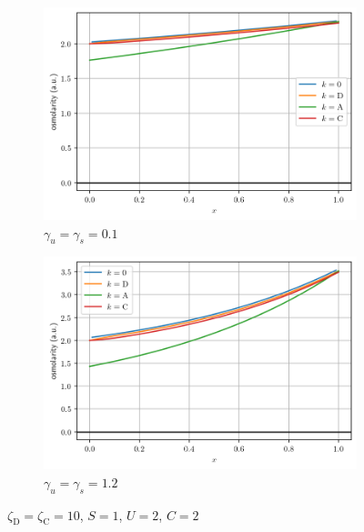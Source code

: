 \documentclass{article}
\numberwithin{equation}{section} %
\begin{document}
\begin{figure}
    \centering
    \begin{subfigure}{0.8\textwidth}
        \centering
        \includegraphics[width=\linewidth]{../results/7-20-2023/osm_low_solute_perm.png}
        \caption{$\gamma_u = \gamma_s = 0.1$}
        \label{fig:low_sol_perm}
        \vspace*{4mm}
    \end{subfigure}

    \begin{subfigure}{0.8\textwidth}
        \centering
        \includegraphics[width=\linewidth]{../results/7-20-2023/osm_high_solute_perm.png}
        \caption{$\gamma_u = \gamma_s = 1.2$}
        \label{fig:high_sol_perm}
    \end{subfigure}
    \caption{$\zeta_\mathrm{D} = \zeta_\mathrm{C} = 10$, $S = 1$, $U = 2$, $C = 2$}
    \label{fig:typical_sol}
\end{figure}
\end{document}
